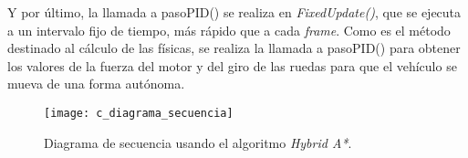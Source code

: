 Y por último, la llamada a pasoPID() se realiza en \textit{FixedUpdate()}, que se ejecuta a un intervalo fijo de tiempo, más rápido que a cada \textit{frame}. Como es el método destinado al cálculo de las físicas, se realiza la llamada a pasoPID() para obtener los valores de la fuerza del motor y del giro de las ruedas para que el vehículo se mueva de una forma autónoma.

\begin{figure}[htpb]
    \centering
    \texttt{[image: c\_diagrama\_secuencia]}
    \caption[Diagrama de secuencia]{Diagrama de secuencia usando el algoritmo \textit{Hybrid A*}.}
    \label{fig:cdiagramasecuencia}
\end{figure}


